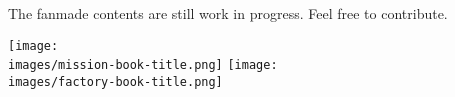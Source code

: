 \begin{multicols*}{2}
  The fanmade contents are still work in progress. Feel free to contribute.

  \begin{multicols}{2}
      \texttt{[image: \\images/mission-book-title.png]}
      \texttt{[image: \\images/factory-book-title.png]}
  \end{multicols}

\end{multicols*}
